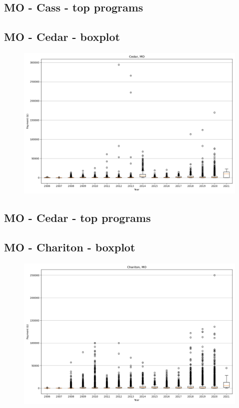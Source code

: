 \subsection*{MO - Cass - top programs}

\newpage
\subsection*{MO - Cedar - boxplot}
\begin{figure}[h]
\centering
\includegraphics[width=7in]{../output/boxplots/counties/Cedar-MO_boxplot.png}
\end{figure}


\subsection*{MO - Cedar - top programs}

\newpage
\subsection*{MO - Chariton - boxplot}
\begin{figure}[h]
\centering
\includegraphics[width=7in]{../output/boxplots/counties/Chariton-MO_boxplot.png}
\end{figure}


